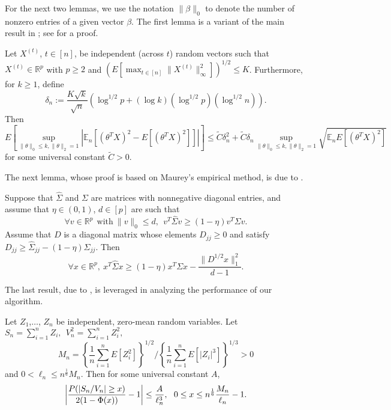 \documentclass[opre,nonblindrev]{informs3} %
\def\En{{\mathbb{E}_n}}
\begin{document}
\begin{APPENDIX}{}
For the next two lemmas, we use the notation $\|\beta \|_0$ to denote the number of nonzero entries of a given vector $\beta$.
The first lemma is a variant of the main result in \cite{RudelsonVershynin2008}; see \cite{BCCW-ManyProcesses} for a proof.

\begin{lemma}\label{thm:RV34}
	Let  $X^{(t)}$, $t\in[n]$, be independent (across $t$) random vectors such that $X^{(t)}  \in \mathbb{R}^p$ with $p\geq 2$ and $(E[ \max_{t\in[n]}\|X^{(t)}\|_\infty^2])^{1/2} \leq K$. Furthermore, for $k\geq 1$, define
	$$
	\delta_n:= \frac{K \sqrt{k}}{\sqrt n}\left( \log^{1/2} p + (\log k) (\log^{1/2}p) (\log^{1/2} n) \right).
	$$
	Then
	$$
	E\left[ \sup_{\|\theta\|_0\leq k, \|\theta\|_2 =1} \left| \En[ (\theta^T X)^2 - E[(\theta^T X)^2] ]\right|\right]
	 \leq  \tilde C\delta_n^2 +  \tilde  C\delta_n \sup_{\|\theta\|_0\leq k, \|\theta\|_2 =1 } \sqrt{\En E[(\theta^TX)^2]}
	$$	
	for some universal constant $\tilde C>0$.
\end{lemma}

The next lemma,
whose  proof is based on Maurey's empirical method,
is due to \cite{oliveira2016}.

\begin{lemma}\label{lemma:Transfer} Suppose that $\hat \Sigma$ and $\Sigma$ are matrices with nonnegative diagonal entries, and assume that $\eta \in (0,1)$, $d\in[p]$ are such that
	$$ \forall v \in \mathbb{R}^p \ \ \mbox{with} \ \|v\|_0 \leq d, \ \ v^T\hat\Sigma v\geq (1-\eta)v^T\Sigma v.$$
	Assume that $D$ is a diagonal matrix whose elements $D_{jj}\geq 0$ and satisfy $D_{jj}\geq \hat \Sigma_{jj}-(1-\eta) \Sigma_{jj}$. Then
	$$ \forall x \in \mathbb{R}^p,  \ x^T\hat\Sigma x\geq (1-\eta)x^T\Sigma x - \frac{\|D^{1/2}x\|_1^2}{d-1}.$$
\end{lemma}

 
The last result, due to 
\cite{jing2003self},
 is leveraged in 
analyzing the performance of our algorithm.
\begin{lemma}\label{Lemma: MDSN} Let $Z_{1}$,$\ldots$, $Z_{n}$ be independent, zero-mean random variables. Let
	$S_{n} = \sum_{i=1}^n Z_i,  \ \ V^2_{n} = \sum_{i=1}^nZ^2_i,$ $$M_n= \left \{\frac{1}{n} \sum_{i=1}^n E [ Z_i^2 ] \right \}^{1/2} \Big / \left \{\frac{1}{n} \sum_{i=1}^n E[|Z_i|^{3}] \right\}^{1/3}>0$$
	and $0< \ell_n \leq n^{\frac{1}{6}}M_n$. Then for some universal 
	constant $A$,
	$$
	\left |\frac{P(|S_{n}/V_{n}|  \geq x) }{ 2 (1-\Phi(x))} - 1 \right |  \leq
	\frac{A}{ \ell_n^{3}},  \ \ 0 \leq  x \leq  n^{\frac{1}{6}}\frac{M_n}{\ell_n}-1. \\
	$$
\end{lemma}


    	\end{APPENDIX}
\end{document}
